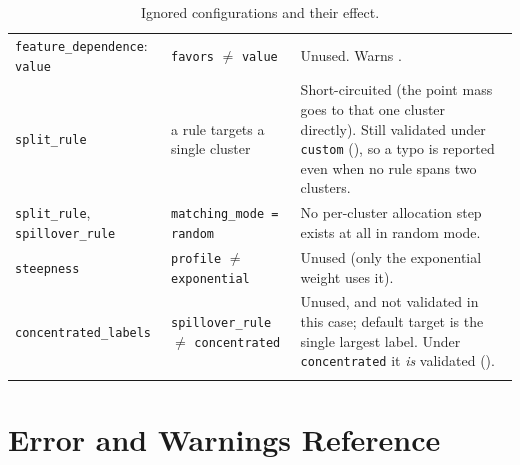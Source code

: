 \documentclass[a4paper,11pt]{article}
\newcommand{\vcode}[1]{\textcolor{valred}{\bfseries\ttfamily #1}}
\newcommand{\wcode}[1]{\textcolor{warnamber}{\bfseries\ttfamily #1}}
\begin{document}
\begin{longtable}{@{}L{4.2cm} L{5.4cm} L{6.0cm}@{}}
\texttt{feature\_dependence}: \texttt{value} & \texttt{favors} $\neq$ \texttt{value} & Unused. Warns \wcode{305}. \\
\texttt{split\_rule} & a rule targets a single cluster & Short-circuited (the point mass goes to that one cluster directly). Still validated under \texttt{custom} (\vcode{108}), so a typo is reported even when no rule spans two clusters. \\
\texttt{split\_rule}, \texttt{spillover\_rule} & \texttt{matching\_mode = random} & No per-cluster allocation step exists at all in random mode. \\
\texttt{steepness} & \texttt{profile} $\neq$ \texttt{exponential} & Unused (only the exponential weight uses it). \\
\texttt{concentrated\_labels} & \texttt{spillover\_rule} $\neq$ \texttt{concentrated} & Unused, and not validated in this case; default target is the single largest label. Under \texttt{concentrated} it \emph{is} validated (\vcode{128}). \\
\bottomrule
\caption{Ignored configurations and their effect.}
\end{longtable}
\newpage
\section{Error and Warnings Reference}
\footnotesize
\setlength{\tabcolsep}{4pt}
\end{document}
